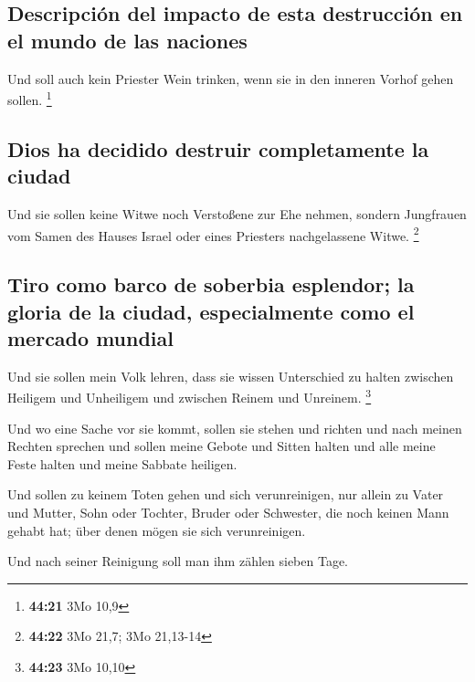 \hypertarget{descripciuxf3n-del-impacto-de-esta-destrucciuxf3n-en-el-mundo-de-las-naciones}{%
\subsection{Descripción del impacto de esta destrucción en el mundo de
las
naciones}\label{descripciuxf3n-del-impacto-de-esta-destrucciuxf3n-en-el-mundo-de-las-naciones}}

 Und soll auch kein Priester Wein trinken, wenn sie in
den inneren Vorhof gehen sollen. \footnote{\textbf{44:21} 3Mo 10,9}

\hypertarget{dios-ha-decidido-destruir-completamente-la-ciudad}{%
\subsection{Dios ha decidido destruir completamente la
ciudad}\label{dios-ha-decidido-destruir-completamente-la-ciudad}}

 Und sie sollen keine Witwe noch Verstoßene zur Ehe
nehmen, sondern Jungfrauen vom Samen des Hauses Israel oder eines
Priesters nachgelassene Witwe. \footnote{\textbf{44:22} 3Mo 21,7; 3Mo
  21,13-14}

\hypertarget{tiro-como-barco-de-soberbia-esplendor-la-gloria-de-la-ciudad-especialmente-como-el-mercado-mundial}{%
\subsection{Tiro como barco de soberbia esplendor; la gloria de la
ciudad, especialmente como el mercado
mundial}\label{tiro-como-barco-de-soberbia-esplendor-la-gloria-de-la-ciudad-especialmente-como-el-mercado-mundial}}

 Und sie sollen mein Volk lehren, dass sie wissen
Unterschied zu halten zwischen Heiligem und Unheiligem und zwischen
Reinem und Unreinem. \footnote{\textbf{44:23} 3Mo 10,10}

 Und wo eine Sache vor sie kommt, sollen sie stehen und
richten und nach meinen Rechten sprechen und sollen meine Gebote und
Sitten halten und alle meine Feste halten und meine Sabbate heiligen.

 Und sollen zu keinem Toten gehen und sich verunreinigen,
nur allein zu Vater und Mutter, Sohn oder Tochter, Bruder oder
Schwester, die noch keinen Mann gehabt hat; über denen mögen sie sich
verunreinigen.

 Und nach seiner Reinigung soll man ihm zählen sieben
Tage.

